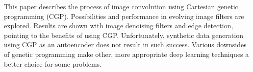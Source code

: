 This paper describes the process of image convolution using Cartesian genetic programming (CGP).
Possibilities and performance in evolving image filters are explored.
Results are shown with image denoising filters and edge detection, pointing to the benefits of using CGP.
Unfortunately, synthetic data generation using CGP as an autoencoder does not result in such success.
Various downsides of genetic programming make other, more appropriate deep learning techniques a better choice for some problems.
